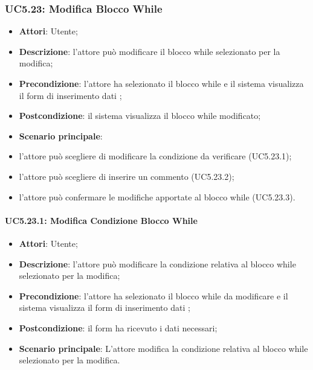\subsubsection{UC5.23: Modifica Blocco While}
\label{UC5.23}
\begin{itemize}
\item \textbf{Attori}: Utente;
\item \textbf{Descrizione}: l'attore può modificare il blocco while selezionato per la modifica;
\item \textbf{Precondizione}: l'attore ha selezionato il blocco while e il sistema visualizza il form di inserimento dati ;	
\item \textbf{Postcondizione}: il sistema visualizza il blocco while modificato;	
\item \textbf{Scenario principale}:
\item l'attore può scegliere di modificare la condizione da verificare (UC5.23.1);
\item l'attore può scegliere di inserire un commento (UC5.23.2);
\item l'attore può confermare le modifiche apportate al blocco while (UC5.23.3).
\end{itemize}
\paragraph{UC5.23.1: Modifica Condizione Blocco While}
\label{UC5.23.1}
\begin{itemize}
\item \textbf{Attori}: Utente;
\item \textbf{Descrizione}: l'attore può modificare la condizione relativa al blocco while selezionato per la modifica;
\item \textbf{Precondizione}: l'attore ha selezionato il blocco while da modificare e il sistema visualizza il form di inserimento dati ;	
\item \textbf{Postcondizione}: il form ha ricevuto i dati necessari;	
\item \textbf{Scenario principale}:
L'attore modifica la condizione relativa al blocco while selezionato per la modifica.
\end{itemize}
